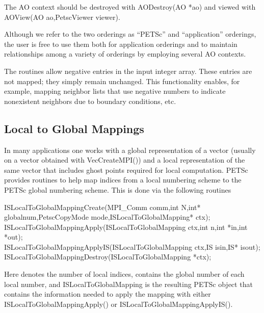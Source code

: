 The AO context should be destroyed with AODestroy(AO *ao)
and viewed with AOView(AO ao,PetscViewer viewer).

Although we refer to the two orderings as ``PETSc'' and
``application'' orderings, the user is free to use them both for
application orderings and to maintain relationships among a variety of
orderings by employing several AO contexts.

The  routines allow negative entries in the input
integer array. These entries are not mapped; they simply remain
unchanged.  This functionality enables, for example, mapping neighbor
lists that use negative numbers to indicate nonexistent neighbors due
to boundary conditions, etc.

\subsection{Local to Global Mappings}
\label{sec_islocaltoglobalmapping}

In many applications one works with a global representation of a vector
(usually on a vector obtained with VecCreateMPI()) 
and a local representation of the same vector that includes ghost points 
required for local computation.  
 
PETSc provides routines to help map indices from a local numbering scheme to 
the PETSc global numbering scheme. This is done via the following routines
\begin{tabbing}
  ISLocalToGlobalMappingCreate(MPI\_Comm comm,int N,int* globalnum,PetscCopyMode mode,ISLocalToGlobalMapping* ctx);\\
  ISLocalToGlobalMappingApply(ISLocalToGlobalMapping ctx,int n,int *in,int *out);\\
  ISLocalToGlobalMappingApplyIS(ISLocalToGlobalMapping ctx,IS isin,IS* isout);\\
  ISLocalToGlobalMappingDestroy(ISLocalToGlobalMapping *ctx);
\end{tabbing}
Here  denotes the number of local indices,  contains the
global number of each local number, and ISLocalToGlobalMapping is the 
resulting PETSc object that contains the information needed to apply the mapping with 
either ISLocalToGlobalMappingApply() or 
ISLocalToGlobalMappingApplyIS().

